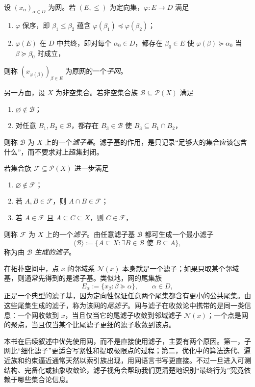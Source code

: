 \begin{definition}[子网与滤子]\label{def:subnet-filter}
设 $(x_\alpha)_{\alpha\in D}$ 为网。若 $(E,\le)$ 为定向集，$\varphi\colon E\to D$ 满足
\begin{enumerate}
  \item $\varphi$ 保序，即 $\beta_1\le \beta_2$ 蕴含 $\varphi(\beta_1)\preceq \varphi(\beta_2)$；
  \item $\varphi(E)$ 在 $D$ 中共终，即对每个 $\alpha_0\in D$，都存在 $\beta_0\in E$ 使 $\varphi(\beta)\succeq \alpha_0$ 当 $\beta\succeq\beta_0$ 时成立，
\end{enumerate}
则称 $(x_{\varphi(\beta)})_{\beta\in E}$ 为原网的一个\emph{子网}。

另一方面，设 $X$ 为非空集合。若非空集合族 $\mathcal B\subseteq \mathcal P(X)$ 满足
\begin{enumerate}
  \item $\varnothing\notin \mathcal B$；
  \item 对任意 $B_1,B_2\in\mathcal B$，都存在 $B_3\in\mathcal B$ 使 $B_3\subseteq B_1\cap B_2$，
\end{enumerate}
则称 $\mathcal B$ 为 $X$ 上的一个\emph{滤子基}。滤子基的作用，是只记录“足够大的集合应该包含什么”，而不要求对上超集封闭。

若集合族 $\mathcal F\subseteq \mathcal P(X)$ 进一步满足
\begin{enumerate}
  \item $\varnothing\notin \mathcal F$；
  \item 若 $A,B\in\mathcal F$，则 $A\cap B\in\mathcal F$；
  \item 若 $A\in\mathcal F$ 且 $A\subseteq C\subseteq X$，则 $C\in\mathcal F$，
\end{enumerate}
则称 $\mathcal F$ 为 $X$ 上的一个\emph{滤子}。由任意滤子基 $\mathcal B$ 都可生成一个最小滤子
\[
\langle \mathcal B\rangle
:=
\{A\subseteq X:\exists B\in\mathcal B\text{ 使 }B\subseteq A\},
\]
称为由 $\mathcal B$ \emph{生成的滤子}。

在拓扑空间中，点 $x$ 的邻域系 $\mathcal N(x)$ 本身就是一个滤子；如果只取某个邻域基，则通常先得到的是滤子基。类似地，网的尾集族
\[
E_\alpha:=\{x_\beta:\beta\succeq\alpha\},\qquad \alpha\in D,
\]
正是一个典型的滤子基，因为定向性保证任意两个尾集都含有更小的公共尾集。由这些尾集生成的滤子，称为该网的\emph{尾滤子}。网与滤子在收敛论中携带的是同一类信息：一个网收敛到 $x$，当且仅当它的尾滤子收敛到邻域滤子 $\mathcal N(x)$；一个点是网的聚点，当且仅当某个比尾滤子更细的滤子收敛到该点。

本书在后续叙述中优先使用网，而不是直接使用滤子，主要有两个原因。第一，子网比“细化滤子”更适合写紧性和提取极限点的过程；第二，优化中的算法迭代、逼近族和约束逼近通常天然以索引族出现，用网语言书写更直接。不过一旦进入可测结构、完备化或抽象收敛论，滤子视角会帮助我们更清楚地识别“最终行为”究竟依赖于哪些集合论信息。
\end{definition}

